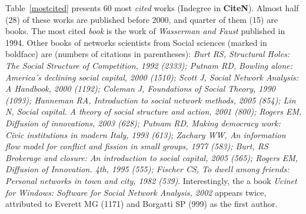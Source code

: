 \documentclass[11pt]{article} %
\begin{document}
Table~\ref{mostcited} presents 60 most \textit{cited} works (Indegree in \textbf{CiteN}). Almost half (28) of these works are published before 2000, and quarter of them (15) are books. The most cited \textit{book} is the work of \textit{Wasserman and Faust} published in 1994. Other books of networks scientists from Social sciences (marked in boldface) are (numbers of citations in parentheses):  \textit{Burt RS, Structural Holes: The Social Structure of Competition, 1992 (2333); Putnam RD, Bowling alone: America’s declining social capital, 2000 (1510); Scott J, Social Network Analysis: A Handbook, 2000 (1192);  Coleman J, Foundations of Social Theory, 1990 (1093); Hanneman RA, Introduction to social network methods, 2005 (854); Lin N, Social capital. A theory of social structure and action, 2001 (800); Rogers EM, Diffusion of innovations, 2003 (628); Putnam RD, Making democracy work: Civic institutions in modern Italy, 1993 (613); Zachary WW, An information flow model for conflict and fission in small groups, 1977 (583); Burt, RS Brokerage and closure: An introduction to social capital, 2005 (565);  Rogers EM, Diffusion of Innovation. 4th, 1995 (555);  Fischer CS, To dwell among friends: Personal networks in town and city, 1982 (539)}. Interestingly, the a book \textit{Ucinet for Windows: Software for Social Network Analysis, 2002} appears twice, attributed to Everett MG (1171) and Borgatti SP (999) as the first author. \medskip 
\end{document}
